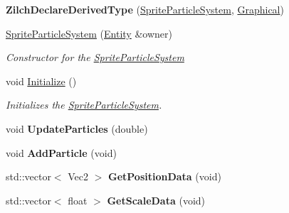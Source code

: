 \begin{DoxyCompactItemize}
\item 
\hypertarget{classDCEngine_1_1Components_1_1SpriteParticleSystem_ac3d912d150a438cdd4773f76dd9f6e40}{{\bfseries Zilch\-Declare\-Derived\-Type} (\hyperlink{classDCEngine_1_1Components_1_1SpriteParticleSystem}{Sprite\-Particle\-System}, \hyperlink{classDCEngine_1_1Components_1_1Graphical}{Graphical})}\label{classDCEngine_1_1Components_1_1SpriteParticleSystem_ac3d912d150a438cdd4773f76dd9f6e40}

\item 
\hyperlink{classDCEngine_1_1Components_1_1SpriteParticleSystem_a9cf33773928923beabac294606b9120e}{Sprite\-Particle\-System} (\hyperlink{classDCEngine_1_1Entity}{Entity} \&owner)
\begin{DoxyCompactList}\small\item\em Constructor for the \hyperlink{classDCEngine_1_1Components_1_1SpriteParticleSystem}{Sprite\-Particle\-System}  \end{DoxyCompactList}\item 
void \hyperlink{classDCEngine_1_1Components_1_1SpriteParticleSystem_a1f398536c7f84f4af7883352d349beeb}{Initialize} ()
\begin{DoxyCompactList}\small\item\em Initializes the \hyperlink{classDCEngine_1_1Components_1_1SpriteParticleSystem}{Sprite\-Particle\-System}.  \end{DoxyCompactList}\item 
\hypertarget{classDCEngine_1_1Components_1_1SpriteParticleSystem_a30960709dd9e7056f3ada6214364e639}{void {\bfseries Update\-Particles} (double)}\label{classDCEngine_1_1Components_1_1SpriteParticleSystem_a30960709dd9e7056f3ada6214364e639}

\item 
\hypertarget{classDCEngine_1_1Components_1_1SpriteParticleSystem_a5e5588a439763dffeae1d4f9acac17b5}{void {\bfseries Add\-Particle} (void)}\label{classDCEngine_1_1Components_1_1SpriteParticleSystem_a5e5588a439763dffeae1d4f9acac17b5}

\item 
\hypertarget{classDCEngine_1_1Components_1_1SpriteParticleSystem_a5e2b856558ec5e207d4d1f753946f70d}{std\-::vector$<$ Vec2 $>$ {\bfseries Get\-Position\-Data} (void)}\label{classDCEngine_1_1Components_1_1SpriteParticleSystem_a5e2b856558ec5e207d4d1f753946f70d}

\item 
\hypertarget{classDCEngine_1_1Components_1_1SpriteParticleSystem_a410e6afc89e9bf3de7d132ef6c6d38e4}{std\-::vector$<$ float $>$ {\bfseries Get\-Scale\-Data} (void)}\label{classDCEngine_1_1Components_1_1SpriteParticleSystem_a410e6afc89e9bf3de7d132ef6c6d38e4}


\end{DoxyCompactItemize}
